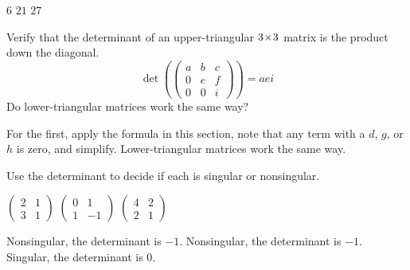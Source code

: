 \begin{exercises}
    \begin{answer}
      \begin{exparts*}
        \partsitem \( 6 \)
        \partsitem \( 21 \)
        \partsitem \( 27 \)
      \end{exparts*}  
    \end{answer}
  \recommended \item  
    Verify that the determinant of an upper-triangular
    $3 \! \times \! 3$ matrix is the product down the diagonal. 
    \begin{equation*}
       \det(
       \begin{pmatrix}
           a    &b   &c    \\
           0    &e   &f    \\
           0    &0   &i
       \end{pmatrix}
       )
       =aei
    \end{equation*}
    Do lower-triangular matrices work the same way?
    \begin{answer}
      For the first, apply the formula in this section, note that any
      term with a \( d \), \( g \), or \( h \) is zero, and simplify.
      Lower-triangular matrices work the same way.  
    \end{answer}
  \recommended \item 
     Use the determinant to decide if each is singular or
     nonsingular.
     \begin{exparts*}
       \partsitem \(
            \begin{pmatrix}
                2    &1   \\
                3    &1
            \end{pmatrix}    \)
       \partsitem \(
            \begin{pmatrix}
                0    &1   \\
                1    &-1
            \end{pmatrix}    \)
       \partsitem \(
            \begin{pmatrix}
                4    &2   \\
                2    &1
            \end{pmatrix}    \)
     \end{exparts*}
     \begin{answer}
       \begin{exparts}
         \partsitem Nonsingular, the determinant is \( -1 \).
         \partsitem Nonsingular, the determinant is \( -1 \).
         \partsitem Singular, the determinant is \( 0 \).

\end{exparts}
\end{answer}
\end{exercises}

